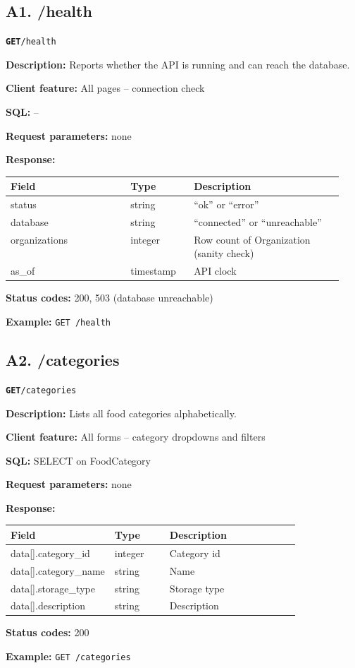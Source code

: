 \documentclass[11pt,letterpaper]{article}
\newcommand{\brk}{\penalty0\relax}
\newcommand{\routebar}[2]{%
  \par\noindent\colorbox{boxGray}{\parbox{\dimexpr\linewidth-2\fboxsep}{%
  \strut\textbf{\texttt{#1}}\quad\texttt{#2}\strut}}\par\smallskip}
\newcommand{\kv}[2]{\textbf{#1:} #2\par}
\begin{document}
\subsection*{A1. /health}
\routebar{GET}{/health}
\kv{Description}{Reports whether the API is running and can reach the database.}
\kv{Client feature}{All pages -- connection check}
\kv{SQL}{--}
\kv{Request parameters}{none}
\kv{Response}{}
\begin{xltabular}{\linewidth}{>{\ttfamily\raggedright\arraybackslash}p{0.36\linewidth} >{\raggedright\arraybackslash}p{0.19\linewidth} >{\raggedright\arraybackslash}X}
\toprule
\textrm{\textbf{Field}} & \textbf{Type} & \textbf{Description} \\
\midrule
status & string & ``ok'' or ``error'' \\
database & string & ``connected'' or ``unreachable'' \\
organizations & integer & Row count of Organization (sanity check) \\
as\_of & timestamp & API clock \\
\bottomrule
\end{xltabular}
\kv{Status codes}{200, 503 (database unreachable)}
{\raggedright\textbf{Example:} {\small \texttt{GET /\brk{}health}}\par}
\subsection*{A2. /categories}
\routebar{GET}{/categories}
\kv{Description}{Lists all food categories alphabetically.}
\kv{Client feature}{All forms -- category dropdowns and filters}
\kv{SQL}{SELECT on FoodCategory}
\kv{Request parameters}{none}
\kv{Response}{}
\begin{xltabular}{\linewidth}{>{\ttfamily\raggedright\arraybackslash}p{0.36\linewidth} >{\raggedright\arraybackslash}p{0.19\linewidth} >{\raggedright\arraybackslash}X}
\toprule
\textrm{\textbf{Field}} & \textbf{Type} & \textbf{Description} \\
\midrule
data[].\brk{}category\_id & integer & Category id \\
data[].\brk{}category\_name & string & Name \\
data[].\brk{}storage\_type & string & Storage type \\
data[].\brk{}description & string & Description \\
\bottomrule
\end{xltabular}
\kv{Status codes}{200}
{\raggedright\textbf{Example:} {\small \texttt{GET /\brk{}categories}}\par}
\end{document}
